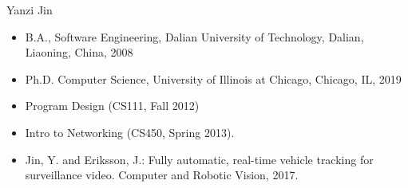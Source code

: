 \vita
\begin{singlespace}
    \begin{description}[labelwidth=4cm,leftmargin=4.2cm,itemsep=1em]

        \item[NAME] Yanzi Jin

        \item[EDUCATION] 
        \begin{itemize}[label={},listparindent=0pt,itemindent=0pt,leftmargin=0pt,itemsep=1em,parsep=0pt,topsep=0pt,partopsep=0pt]
                \item B.A., Software Engineering, Dalian University of Technology, Dalian, Liaoning, China, 2008
                \item Ph.D. Computer Science, University of Illinois at Chicago, Chicago, IL, 2019
        \end{itemize}

        \item[TEACHING] 
        \begin{itemize}[label={},listparindent=0pt,itemindent=0pt,leftmargin=0pt,itemsep=1em,parsep=0pt,topsep=0pt,partopsep=0pt]
                \item Program Design (CS111, Fall 2012)
                \item Intro to Networking (CS450, Spring 2013).
        \end{itemize}

        \item[PUBLICATIONS]
            \begin{itemize}[label={},listparindent=0pt,itemindent=0pt,leftmargin=0pt,itemsep=1em,parsep=0pt,topsep=0pt,partopsep=0pt]

                \item Jin, Y. and Eriksson, J.: Fully automatic, real-time vehicle tracking for surveillance video. Computer and Robotic Vision, 2017.

            \end{itemize}
    \end{description}
\end{singlespace}
